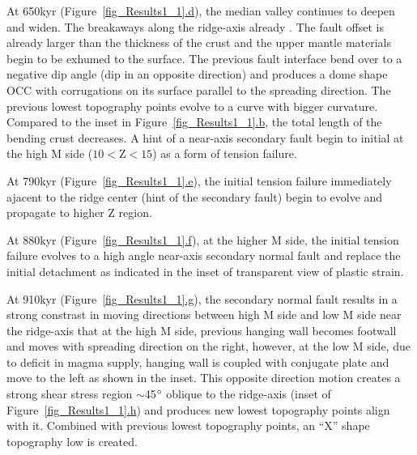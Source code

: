 
At 650kyr (Figure~\hyperref[fig_Results1_1]{\ref{fig_Results1_1}.d}), the median valley continues to deepen and widen. The breakaways along the ridge-axis already . The fault offset is already larger than the thickness of the crust and the upper mantle materials begin to be exhumed to the surface. The previous fault interface bend over to a negative dip angle (dip in an opposite direction) and produces a dome shape OCC with corrugations on its surface parallel to the spreading direction. The previous lowest topography points evolve to a curve with bigger curvature. Compared to the inset in Figure~\hyperref[fig_Results1_1]{\ref{fig_Results1_1}.b}, the total length of the bending crust decreases. A hint of a near-axis secondary fault begin to initial at the high M side ($10<$Z$<15$) as a form of tension failure. 

At 790kyr (Figure~\hyperref[fig_Results1_1]{\ref{fig_Results1_1}.e}), the initial tension failure immediately ajacent to the ridge center (hint of the secondary fault) begin to evolve and propagate to higher Z region.  

At 880kyr (Figure~\hyperref[fig_Results1_1]{\ref{fig_Results1_1}.f}), at the higher M side, the initial tension failure evolves to a high angle near-axis secondary normal fault and replace the initial detachment as indicated in the inset of transparent view of plastic strain.

At 910kyr (Figure~\hyperref[fig_Results1_1]{\ref{fig_Results1_1}.g}), the secondary normal fault results in a strong constrast in moving directions between high M side and low M side near the ridge-axis that at the high M side, previous hanging wall becomes footwall and moves with spreading direction on the right, however, at the low M side, due to deficit in magma supply, hanging wall is coupled with conjugate plate and move to the left as shown in the inset. This opposite direction motion creates a strong shear stress region $\sim$45$\degree$ oblique to the ridge-axis (inset of Figure~\hyperref[fig_Results1_1]{\ref{fig_Results1_1}.h}) and produces new lowest topography points align with it. Combined with previous lowest topography points, an ``X'' shape topography low is created.

